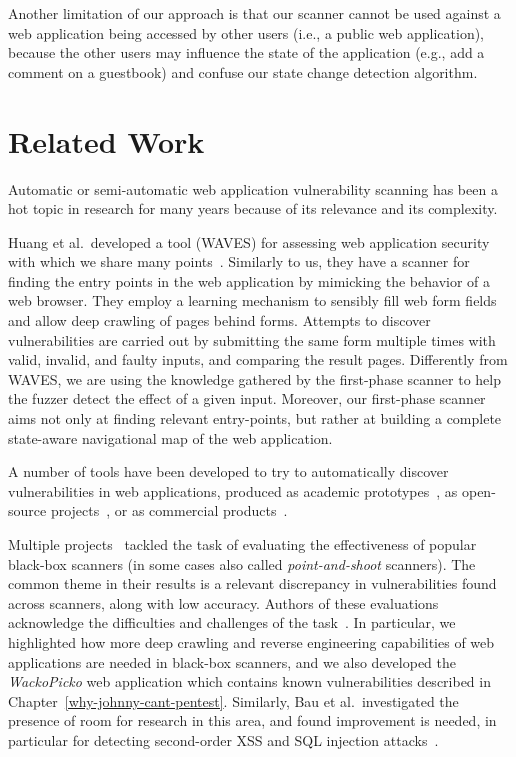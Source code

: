 Another limitation of our approach is that our scanner cannot be used against a
web application being accessed by other users (i.e., a public web application), because
the other users may influence the state of the application (e.g., add a comment
on a guestbook) and confuse our state change detection algorithm. 

\section{Related Work}

Automatic or semi-automatic web application vulnerability scanning has been a
hot topic in research for many years because of its relevance and its
complexity. 

Huang et al.\ developed a tool (WAVES) for assessing web application
security with which we share many points~\cite{huang03:web}. Similarly to us, they have a scanner
for finding the entry points in the web application by mimicking the behavior of
a web browser. They employ a learning mechanism to sensibly fill
web form fields and allow deep crawling of pages behind forms. Attempts to
discover vulnerabilities are carried out by submitting the same form multiple
times with valid, invalid, and faulty inputs, and comparing the result pages.
Differently from WAVES, we are using the knowledge gathered by the first-phase
scanner to help the fuzzer detect the effect of a given input. Moreover,
our first-phase scanner aims not only at finding relevant entry-points, but
rather at building a complete state-aware navigational map of the web
application.

A number of tools have been developed to try to automatically discover
vulnerabilities in web applications, produced as academic
prototypes~\cite{kals06:secubat, halfond09:penetration, jovanovic10:static,
huang04:securing, balzarotti08:saner, felmetsger10:logic, li12:sentinel}, as open-source
projects~\cite{w3af, grendelscan, paros}, or as commercial
products~\cite{acunetix, appscan, burp, webinspect}.

Multiple projects~\cite{bau10:state, suto10:webscanners,
  vieira09} tackled the task of evaluating the effectiveness of popular
black-box scanners (in some cases also called \emph{point-and-shoot} scanners).
The common theme in their results is a relevant discrepancy in vulnerabilities
found across scanners, along with low accuracy. Authors of these evaluations
acknowledge the difficulties and challenges of the
task~\cite{grossman04, vieira09}. In particular, we
highlighted how more deep crawling and reverse engineering capabilities of web
applications are needed in black-box scanners, and we also developed the
\emph{WackoPicko} web application which contains known vulnerabilities described in Chapter~\ref{why-johnny-cant-pentest}. Similarly, Bau
et al.\ investigated the presence of room for research in this area, and found
improvement is needed, in particular for detecting second-order XSS and SQL
injection attacks~\cite{bau10:state}.

